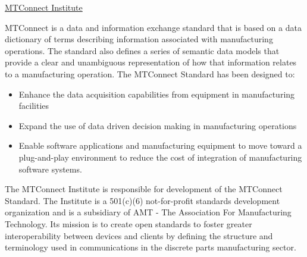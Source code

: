 \quad\underline{MTConnect Institute}



MTConnect is a data and information exchange standard that is based on a data dictionary of terms describing information associated with manufacturing operations.  The standard also defines a series of semantic data models that provide a clear and unambiguous representation of how that information relates to a manufacturing operation.  The MTConnect Standard has been designed to:
\begin{itemize}
    \item Enhance the data acquisition capabilities from equipment in manufacturing facilities
    \item Expand the use of data driven decision making in manufacturing operations
    \item Enable software applications and manufacturing equipment to move toward a plug-and-play environment to reduce the cost of integration of manufacturing software systems.  
\end{itemize}

The MTConnect Institute is responsible for development of the MTConnect Standard.  The Institute is a 501(c)(6) not-for-profit standards development organization and is a subsidiary of AMT - The Association For Manufacturing Technology. Its mission is to create open standards to foster greater interoperability between devices and clients by defining the structure and terminology used in communications in the discrete parts manufacturing sector.
